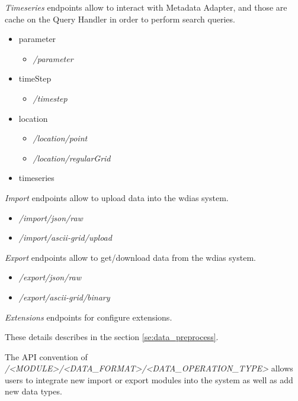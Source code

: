 \emph{Timeseries} endpoints allow to interact with Metadata Adapter, and those are cache on the Query Handler in order to perform search queries.
\begin{itemize}
    \item parameter
    \begin{itemize}
        \item \emph{/parameter}
    \end{itemize}
    \item timeStep
    \begin{itemize}
        \item \emph{/timestep}
    \end{itemize}
    \item location
    \begin{itemize}
        \item \emph{/location/point}
        \item \emph{/location/regularGrid}
    \end{itemize}
    \item timeseries
\end{itemize}

\emph{Import} endpoints allow to upload data into the \acrshort{wdias} system.
\begin{itemize}
    \item \emph{/import/json/raw}
    \item \emph{/import/ascii-grid/upload}
\end{itemize}

\emph{Export} endpoints allow to get/download data from the \acrshort{wdias} system.
\begin{itemize}
    \item \emph{/export/json/raw}
    \item \emph{/export/ascii-grid/binary}
\end{itemize}

\emph{Extensions} endpoints for configure extensions.

These details describes in the section \ref{se:data_preprocess}.

The API convention of \emph{/<MODULE>/<DATA_FORMAT>/<DATA_OPERATION_TYPE>} allows users to integrate new import or export modules into the system as well as add new data types.
